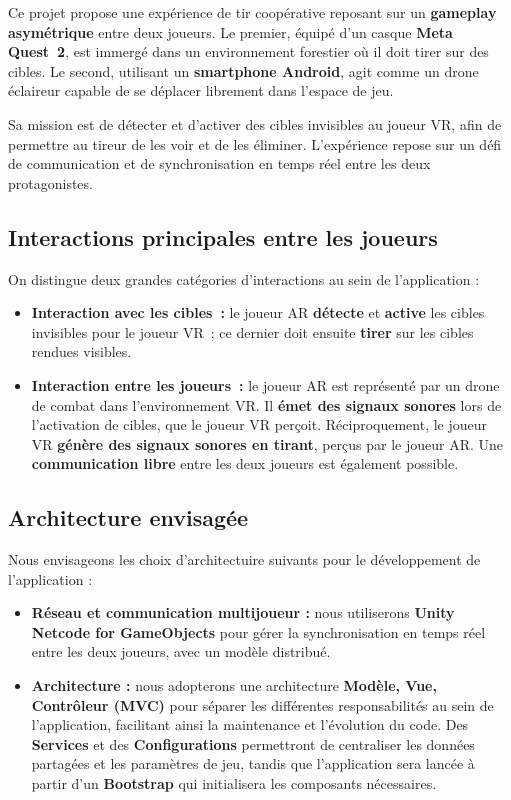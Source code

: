 \documentclass[12pt, a4paper]{article}
\begin{document}
Ce projet propose une expérience de tir coopérative reposant sur un \textbf{gameplay asymétrique} entre deux joueurs. Le premier, équipé d'un casque
\textbf{Meta Quest~2}, est immergé dans un environnement forestier o\`u il doit tirer
sur des cibles. Le second, utilisant un \textbf{smartphone Android}, agit comme un
drone éclaireur capable de se déplacer librement dans l'espace de jeu.

Sa mission est de détecter et d'activer des cibles invisibles au joueur VR, afin de
permettre au tireur de les voir et de les éliminer. L'expérience repose sur un défi
de communication et de synchronisation en temps réel entre les deux protagonistes.

\subsection{Interactions principales entre les joueurs}

On distingue deux grandes catégories d'interactions au sein de l'application :

\begin{itemize}
  \item \textbf{Interaction avec les cibles~:} le joueur AR \textbf{détecte} et \textbf{active} les
        cibles invisibles pour le joueur VR~; ce dernier doit ensuite \textbf{tirer} sur les
        cibles rendues visibles.

  \item \textbf{Interaction entre les joueurs~:} le joueur AR est représenté par un
        drone de combat dans l'environnement VR. Il \textbf{émet des signaux sonores}
        lors de l'activation de cibles, que le joueur VR perçoit. Réciproquement, le
        joueur VR \textbf{génère des signaux sonores en tirant}, per\c{c}us par le joueur AR. Une
        \textbf{communication libre} entre les deux joueurs est également possible.
\end{itemize}

\subsection{Architecture envisagée}

Nous envisageons les choix d'architectuire suivants pour le développement de l'application :
\begin{itemize}
  \item \textbf{Réseau et communication multijoueur :} nous utiliserons \textbf{Unity Netcode for GameObjects} pour gérer la synchronisation en temps réel entre les deux joueurs, avec un modèle distribué.
  \item \textbf{Architecture :} nous adopterons une architecture \textbf{Modèle, Vue, Contrôleur (MVC)} pour séparer les différentes responsabilités au sein de l'application, facilitant ainsi la maintenance et l'évolution du code. Des \textbf{Services} et des \textbf{Configurations} permettront de centraliser les données partagées et les paramètres de jeu, tandis que l'application sera lancée à partir d'un \textbf{Bootstrap} qui initialisera les composants nécessaires.
\end{itemize}
\end{document}
